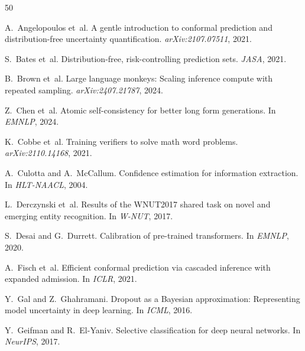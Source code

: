 \documentclass[11pt,a4paper]{article}
\begin{document}
\begin{thebibliography}{50}

A.~Angelopoulos et~al.
\newblock A gentle introduction to conformal prediction and distribution-free uncertainty quantification.
\newblock \emph{arXiv:2107.07511}, 2021.

S.~Bates et~al.
\newblock Distribution-free, risk-controlling prediction sets.
\newblock \emph{JASA}, 2021.

B.~Brown et~al.
\newblock Large language monkeys: Scaling inference compute with repeated sampling.
\newblock \emph{arXiv:2407.21787}, 2024.

Z.~Chen et~al.
\newblock Atomic self-consistency for better long form generations.
\newblock In \emph{EMNLP}, 2024.

K.~Cobbe et~al.
\newblock Training verifiers to solve math word problems.
\newblock \emph{arXiv:2110.14168}, 2021.

A.~Culotta and A.~McCallum.
\newblock Confidence estimation for information extraction.
\newblock In \emph{HLT-NAACL}, 2004.

L.~Derczynski et~al.
\newblock Results of the WNUT2017 shared task on novel and emerging entity recognition.
\newblock In \emph{W-NUT}, 2017.

S.~Desai and G.~Durrett.
\newblock Calibration of pre-trained transformers.
\newblock In \emph{EMNLP}, 2020.

A.~Fisch et~al.
\newblock Efficient conformal prediction via cascaded inference with expanded admission.
\newblock In \emph{ICLR}, 2021.

Y.~Gal and Z.~Ghahramani.
\newblock Dropout as a {B}ayesian approximation: Representing model uncertainty in deep learning.
\newblock In \emph{ICML}, 2016.

Y.~Geifman and R.~El-Yaniv.
\newblock Selective classification for deep neural networks.
\newblock In \emph{NeurIPS}, 2017.


\end{thebibliography}
\end{document}
